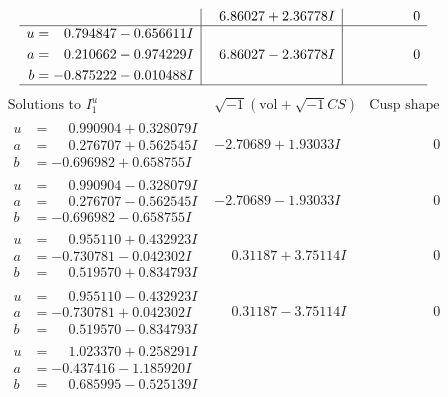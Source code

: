 \documentclass[1p]{elsarticle_modified}
\theoremstyle{definition}
\newcommand{\I}{\sqrt{-1}}
\begin{document}
$$\begin{array}{c|c|c}
 & \phantom{-}6.86027 + 2.36778 I & \phantom{-0.000000 } 0 \\ \hline\begin{aligned}
u &= \phantom{-}0.794847 - 0.656611 I \\
a &= \phantom{-}0.210662 - 0.974229 I \\
b &= -0.875222 - 0.010488 I\end{aligned}
 & \phantom{-}6.86027 - 2.36778 I & \phantom{-0.000000 } 0\\
 \hline 
 \end{array}$$\newpage$$\begin{array}{c|c|c}  
\text{Solutions to }I^u_{1}& \I (\text{vol} + \sqrt{-1}CS) & \text{Cusp shape}\\
 \hline 
\begin{aligned}
u &= \phantom{-}0.990904 + 0.328079 I \\
a &= \phantom{-}0.276707 + 0.562545 I \\
b &= -0.696982 + 0.658755 I\end{aligned}
 & -2.70689 + 1.93033 I & \phantom{-0.000000 } 0 \\ \hline\begin{aligned}
u &= \phantom{-}0.990904 - 0.328079 I \\
a &= \phantom{-}0.276707 - 0.562545 I \\
b &= -0.696982 - 0.658755 I\end{aligned}
 & -2.70689 - 1.93033 I & \phantom{-0.000000 } 0 \\ \hline\begin{aligned}
u &= \phantom{-}0.955110 + 0.432923 I \\
a &= -0.730781 - 0.042302 I \\
b &= \phantom{-}0.519570 + 0.834793 I\end{aligned}
 & \phantom{-}0.31187 + 3.75114 I & \phantom{-0.000000 } 0 \\ \hline\begin{aligned}
u &= \phantom{-}0.955110 - 0.432923 I \\
a &= -0.730781 + 0.042302 I \\
b &= \phantom{-}0.519570 - 0.834793 I\end{aligned}
 & \phantom{-}0.31187 - 3.75114 I & \phantom{-0.000000 } 0 \\ \hline\begin{aligned}
u &= \phantom{-}1.023370 + 0.258291 I \\
a &= -0.437416 - 1.185920 I \\
b &= \phantom{-}0.685995 - 0.525139 I\end{aligned}

\end{array}$$
\end{document}
